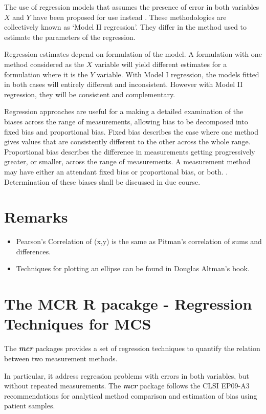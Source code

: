 \documentclass[12pt, a4paper]{report}
\theoremstyle{plain}
\theoremstyle{definition}
\theoremstyle{remark}
\begin{document}
	The use of regression models that assumes the presence of error in both variables $X$ and $Y$ have been proposed for use instead
	\citep{CornCoch,ludbrook97}. These methodologies are collectively known as `Model II regression'. They differ in the method used to
	estimate the parameters of the regression.
	
	Regression estimates depend on formulation of the model. A formulation with one method considered as the $X$ variable will yield different estimates for a formulation where it is the $Y$
	variable. With Model I regression, the models fitted in both cases will entirely different and inconsistent. However with Model II
	regression, they will be consistent and complementary.
	
	Regression approaches are useful for a making a detailed examination of the biases across the range of measurements, allowing bias to be decomposed into fixed bias and proportional bias.
	Fixed bias describes the case where one method gives values that are consistently different to the other across the whole range. Proportional
	bias describes the difference in measurements getting progressively greater, or smaller, across the range of measurements. A measurement method may have either an attendant fixed bias or proportional bias, or both. \citep{ludbrook97}. Determination of these biases shall be discussed in due course.
	
	
	
	\section*{Remarks}
	\begin{itemize}
		\item Pearson's Correlation of (x,y) is the same as Pitman's correlation of sums and differences.
		
		\item Techniques for plotting an ellipse can be found in Douglas Altman's book.
	\end{itemize}
	\section{The MCR R pacakge - Regression Techniques for MCS}
	
	The \textbf{\textit{mcr}} packages provides a set of regression techniques to quantify the relation between two measurement methods.
	
	In particular, it address regression problems with errors in both variables, but without repeated measurements.
	The \textbf{\textit{mcr}} package follows the CLSI EP09-A3 recommendations for analytical
	method comparison and estimation of bias using patient samples.
	
\end{document}
